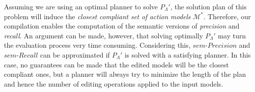 Assuming we are using an optimal planner to solve $P_{\Lambda}'$, the solution plan of this problem will induce the \emph{closest compliant set of action models} $\mathcal{M^*}$. Therefore, our compilation enables the computation of the semantic versions of \emph{precision} and \emph{recall}. An argument can be made, however, that solving optimally $P_{\Lambda}'$ may turn the evaluation process very time consuming. Considering this, $sem\text{-}Precision$ and $sem\text{-}Recall$ can be approximated if $P_{\Lambda}'$ is solved with a satisfying planner. In this case, no guarantees can be made that the edited models will be the closest compliant ones, but a planner will always try to minimize the length of the plan and hence the number of editing operations applied to the input models.



